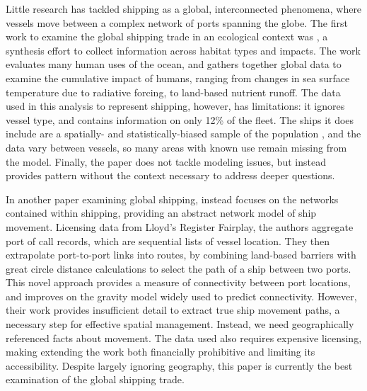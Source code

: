 Little research has tackled shipping as a global, interconnected phenomena, where vessels move between a complex network of ports spanning the globe. The first work to examine the global shipping trade in an ecological context was \cite{Halpern2008}, a synthesis effort to collect information across habitat types and impacts. The work evaluates many human uses of the ocean, and gathers together global data to examine the cumulative impact of humans, ranging from changes in sea surface temperature due to radiative forcing, to land-based nutrient runoff. The data used in this analysis to represent shipping, however, has limitations: it ignores vessel type, %
 and contains information on only 12\% of the fleet. The ships it does include are a spatially- and statistically-biased sample of the population \citep{Wang2007}, and the data vary between vessels, so many areas with known use remain missing from the model. Finally, the paper does not tackle modeling issues, but instead provides pattern without the context necessary to address deeper questions. %

In another paper examining global shipping, \cite{Kaluza2010} instead focuses on the networks contained within shipping, providing an abstract network model of ship movement. Licensing data from Lloyd's Register Fairplay, %
 the authors aggregate port of call records, which are sequential lists of vessel location. They then extrapolate port-to-port links into routes, by combining land-based barriers with great circle distance calculations to select the path of a ship between two ports. This novel approach provides a measure of connectivity between port locations, and improves on the gravity model widely used to predict connectivity.  However, their work provides insufficient detail to extract true ship movement paths, a necessary step for effective spatial management. Instead, we need geographically referenced facts about movement. The data used also requires expensive licensing, making extending the work both financially prohibitive and limiting its accessibility. Despite largely ignoring geography, this paper is currently the best examination of the global shipping trade.


